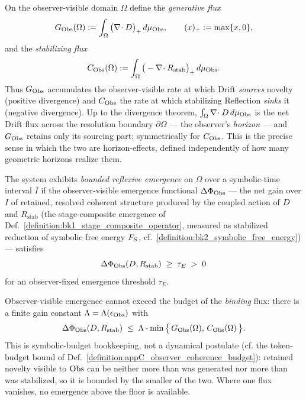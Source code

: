 \begin{definition}
\label{definition:appC_horizon_fluxes}
On the observer-visible domain \(\Omega\) define the \emph{generative flux}
\[
G_{\mathrm{Obs}}(\Omega) := \int_\Omega \big(\nabla\!\cdot D\big)_+ \, d\mu_{\mathrm{Obs}},
\qquad (x)_+ := \max\{x,0\},
\]
and the \emph{stabilizing flux}
\[
C_{\mathrm{Obs}}(\Omega) := \int_\Omega \big(-\nabla\!\cdot R_{\mathrm{stab}}\big)_+ \, d\mu_{\mathrm{Obs}}.
\]
Thus \(G_{\mathrm{Obs}}\) accumulates the observer-visible rate at which Drift \emph{sources}
novelty (positive divergence) and \(C_{\mathrm{Obs}}\) the rate at which stabilizing
Reflection \emph{sinks} it (negative divergence). Up to the divergence theorem,
\(\int_\Omega \nabla\!\cdot D \, d\mu_{\mathrm{Obs}}\) is the net Drift flux across the
resolution boundary \(\partial\Omega\) --- the observer's \emph{horizon} --- and
\(G_{\mathrm{Obs}}\) retains only its sourcing part; symmetrically for \(C_{\mathrm{Obs}}\). This is
the precise sense in which the two are horizon-effects, defined independently of how
many geometric horizons realize them.
\end{definition}

\begin{definition}
\label{definition:appC_bounded_reflexive_emergence}
The system exhibits \emph{bounded reflexive emergence} on \(\Omega\) over a
symbolic-time interval \(I\) if the observer-visible emergence functional
\(\Delta\Phi_{\mathrm{Obs}}\) --- the net gain over \(I\) of retained, resolved coherent
structure produced by the coupled action of \(D\) and \(R_{\mathrm{stab}}\) (the
stage-composite emergence of Def.~\ref{definition:bk1_stage_composite_operator},
measured as stabilized reduction of symbolic free energy \(F_S\),
cf.~\ref{definition:bk2_symbolic_free_energy}) --- satisfies
\[
\Delta\Phi_{\mathrm{Obs}}(D, R_{\mathrm{stab}}) \;\ge\; \tau_E \;>\; 0
\]
for an observer-fixed emergence threshold \(\tau_E\).
\end{definition}

\begin{assumption}
\label{assumption:appC_emergence_domination}
Observer-visible emergence cannot exceed the budget of the \emph{binding} flux:
there is a finite gain constant \(\Lambda=\Lambda(\epsilon_{\mathrm{Obs}})\) with
\[
\Delta\Phi_{\mathrm{Obs}}(D, R_{\mathrm{stab}})
\;\le\; \Lambda \cdot \min\big\{\,G_{\mathrm{Obs}}(\Omega),\, C_{\mathrm{Obs}}(\Omega)\,\big\}.
\]
This is symbolic-budget bookkeeping, not a dynamical postulate (cf. the token-budget
bound of Def.~\ref{definition:appC_observer_coherence_budget}): retained novelty
visible to \(\mathrm{Obs}\) can be neither more than was generated nor more than was
stabilized, so it is bounded by the smaller of the two. Where one flux vanishes, no
emergence above the floor is available.
\end{assumption}

